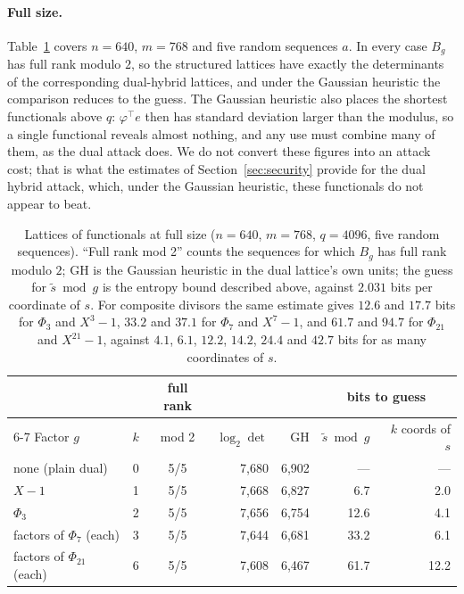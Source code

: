 \documentclass[11pt,a4paper]{article}
\theoremstyle{definition}
\begin{document}
\paragraph{Full size.} Table~\ref{tab:func-full} covers $n = 640$, $m = 768$ and five random sequences $a$. In every case $B_g$ has full rank modulo $2$, so the structured lattices have exactly the determinants of the corresponding dual-hybrid lattices, and under the Gaussian heuristic the comparison reduces to the guess. The Gaussian heuristic also places the shortest functionals above $q$: $\varphi^{\top} e$ then has standard deviation larger than the modulus, so a single functional reveals almost nothing, and any use must combine many of them, as the dual attack does. We do not convert these figures into an attack cost; that is what the estimates of Section~\ref{sec:security} provide for the dual hybrid attack, which, under the Gaussian heuristic, these functionals do not appear to beat.

\begin{table}[H]
\centering
\small
\begin{tabular}{lr c rr rr}
\toprule
& & full rank & & & \multicolumn{2}{c}{bits to guess} \\
\cmidrule(lr){6-7}
Factor $g$ & $k$ & mod 2 & $\log_2 \det$ & GH & $\tilde{s} \bmod g$ & $k$ coords of $s$ \\
\midrule
none (plain dual) & 0 & 5/5 & 7{,}680 & 6{,}902 & --- & --- \\
$X - 1$ & 1 & 5/5 & 7{,}668 & 6{,}827 & 6.7 & 2.0 \\
$\Phi_3$ & 2 & 5/5 & 7{,}656 & 6{,}754 & 12.6 & 4.1 \\
factors of $\Phi_7$ (each) & 3 & 5/5 & 7{,}644 & 6{,}681 & 33.2 & 6.1 \\
factors of $\Phi_{21}$ (each) & 6 & 5/5 & 7{,}608 & 6{,}467 & 61.7 & 12.2 \\
\bottomrule
\end{tabular}
\caption{Lattices of functionals at full size ($n = 640$, $m = 768$, $q = 4096$, five random sequences). ``Full rank mod 2'' counts the sequences for which $B_g$ has full rank modulo $2$; GH is the Gaussian heuristic in the dual lattice's own units; the guess for $\tilde{s} \bmod g$ is the entropy bound described above, against $2.031$ bits per coordinate of $s$. For composite divisors the same estimate gives $12.6$ and $17.7$ bits for $\Phi_3$ and $X^3 - 1$, $33.2$ and $37.1$ for $\Phi_7$ and $X^7 - 1$, and $61.7$ and $94.7$ for $\Phi_{21}$ and $X^{21} - 1$, against $4.1$, $6.1$, $12.2$, $14.2$, $24.4$ and $42.7$ bits for as many coordinates of $s$.}
\label{tab:func-full}
\end{table}
\end{document}
